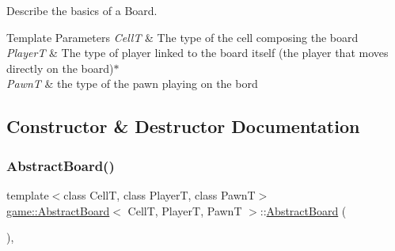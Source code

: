 Describe the basics of a Board. 


\begin{DoxyTemplParams}{Template Parameters}
{\em CellT} & The type of the cell composing the board \\
\hline
{\em PlayerT} & The type of player linked to the board itself (the player that moves directly on the board)$\ast$ \\
\hline
{\em PawnT} & the type of the pawn playing on the bord \\
\hline
\end{DoxyTemplParams}


\subsection{Constructor \& Destructor Documentation}
\mbox{\label{classgame_1_1_abstract_board_a09c49d38999e508f5bc1915209b3cb56}} 
\subsubsection{\texorpdfstring{Abstract\+Board()}{AbstractBoard()}\hspace{0.1cm}{\footnotesize\ttfamily [1/2]}}
{\footnotesize\ttfamily template$<$class CellT, class PlayerT, class PawnT$>$ \\
\hyperlink{classgame_1_1_abstract_board}{game\+::\+Abstract\+Board}$<$ CellT, PlayerT, PawnT $>$\+::\hyperlink{classgame_1_1_abstract_board}{Abstract\+Board} (\begin{DoxyParamCaption}{ }\end{DoxyParamCaption})\hspace{0.3cm}{\ttfamily [explicit]}, {\ttfamily [default]}}

\mbox{\label{classgame_1_1_abstract_board_a648d91d9ffa74ec73fa0844903d9a0fa}} 
